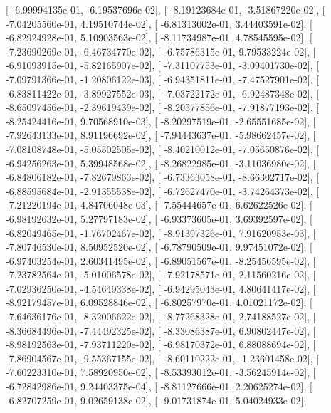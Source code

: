\documentclass{article}
\begin{document}
       [ -6.99994135e-01,  -6.19537696e-02],
       [ -8.19123684e-01,  -3.51867220e-02],
       [ -7.04205560e-01,   4.19510744e-02],
       [ -6.81313002e-01,   3.44403591e-02],
       [ -6.82924928e-01,   5.10903563e-02],
       [ -8.11734987e-01,   4.78545595e-02],
       [ -7.23690269e-01,  -6.46734770e-02],
       [ -6.75786315e-01,   9.79533224e-02],
       [ -6.91093915e-01,  -5.82165907e-02],
       [ -7.31107753e-01,  -3.09401730e-02],
       [ -7.09791366e-01,  -1.20806122e-03],
       [ -6.94351811e-01,  -7.47527901e-02],
       [ -6.83811422e-01,  -3.89927552e-03],
       [ -7.03722172e-01,  -6.92487348e-02],
       [ -8.65097456e-01,  -2.39619439e-02],
       [ -8.20577856e-01,  -7.91877193e-02],
       [ -8.25424416e-01,   9.70568910e-03],
       [ -8.20297519e-01,  -2.65551685e-02],
       [ -7.92643133e-01,   8.91196692e-02],
       [ -7.94443637e-01,  -5.98662457e-02],
       [ -7.08108748e-01,  -5.05502505e-02],
       [ -8.40210012e-01,  -7.05650876e-02],
       [ -6.94256263e-01,   5.39948568e-02],
       [ -8.26822985e-01,  -3.11036980e-02],
       [ -6.84806182e-01,  -7.82679863e-02],
       [ -6.73363058e-01,  -8.66302717e-02],
       [ -6.88595684e-01,  -2.91355538e-02],
       [ -6.72627470e-01,  -3.74264373e-02],
       [ -7.21220194e-01,   4.84706048e-03],
       [ -7.55444657e-01,   6.62622526e-02],
       [ -6.98192632e-01,   5.27797183e-02],
       [ -6.93373605e-01,   3.69392597e-02],
       [ -6.82049465e-01,  -1.76702467e-02],
       [ -8.91397326e-01,   7.91620953e-03],
       [ -7.80746530e-01,   8.50952520e-02],
       [ -6.78790509e-01,   9.97451072e-02],
       [ -6.97403254e-01,   2.60341495e-02],
       [ -6.89051567e-01,  -8.25456595e-02],
       [ -7.23782564e-01,  -5.01006578e-02],
       [ -7.92178571e-01,   2.11560216e-02],
       [ -7.02936250e-01,  -4.54649338e-02],
       [ -6.94295043e-01,   4.80641417e-02],
       [ -8.92179457e-01,   6.09528846e-02],
       [ -6.80257970e-01,   4.01021172e-02],
       [ -7.64636176e-01,  -8.32006622e-02],
       [ -8.77268328e-01,   2.74188527e-02],
       [ -8.36684496e-01,  -7.44492325e-02],
       [ -8.33086387e-01,   6.90802447e-02],
       [ -8.98192563e-01,  -7.93711220e-02],
       [ -6.98170372e-01,   6.88088694e-02],
       [ -7.86904567e-01,  -9.55367155e-02],
       [ -8.60110222e-01,  -1.23601458e-02],
       [ -7.60223310e-01,   7.58920950e-02],
       [ -8.53393012e-01,  -3.56245914e-02],
       [ -6.72842986e-01,   9.24403375e-04],
       [ -8.81127666e-01,   2.20625274e-02],
       [ -6.82707259e-01,   9.02659138e-02],
       [ -9.01731874e-01,   5.04024933e-02],
\end{document}
